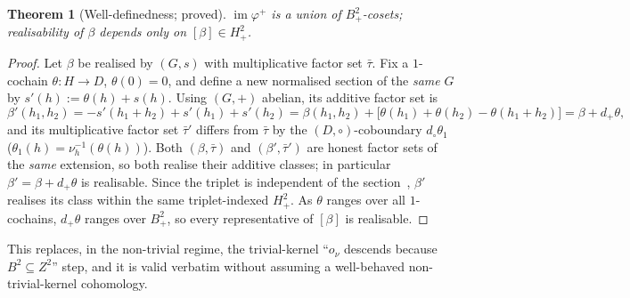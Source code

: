 \documentclass[11pt,reqno]{amsart}
\theoremstyle{plain}
\newtheorem{theorem}{Theorem}[section]
\theoremstyle{definition}
\newcommand{\im}{\operatorname{im}}
\begin{document}
\begin{theorem}[Well-definedness; proved]\label{thm:welldef}
$\im\varphi^{+}$ is a union of $B^2_+$-cosets; realisability of $\beta$ depends only on
$[\beta]\in H^2_+$.
\end{theorem}
\begin{proof}
Let $\beta$ be realised by $(G,s)$ with multiplicative factor set $\bar\tau$. Fix a
$1$-cochain $\theta\colon H\to D$, $\theta(0)=0$, and define a new normalised section of
the \emph{same} $G$ by $s'(h):=\theta(h)+s(h)$. Using $(G,+)$ abelian, its additive factor
set is
\[
\beta'(h_1,h_2)=-s'(h_1{+}h_2)+s'(h_1)+s'(h_2)
=\beta(h_1,h_2)+\big[\theta(h_1)+\theta(h_2)-\theta(h_1{+}h_2)\big]=\beta+d_+\theta,
\]
and its multiplicative factor set $\bar\tau'$ differs from $\bar\tau$ by the
$(D,\circ)$-coboundary $d_\circ\theta_1$ ($\theta_1(h)=\nu_h^{-1}(\theta(h))$). Both
$(\beta,\bar\tau)$ and $(\beta',\bar\tau')$ are honest factor sets of the \emph{same}
extension, so both realise their additive classes; in particular $\beta'=\beta+d_+\theta$
is realisable. Since the triplet is independent of the section~\cite[\S2]{RY}, $\beta'$
realises its class within the same triplet-indexed $H^2_+$. As $\theta$ ranges over all
$1$-cochains, $d_+\theta$ ranges over $B^2_+$, so every representative of $[\beta]$ is
realisable.
\end{proof}

This replaces, in the non-trivial regime, the trivial-kernel ``$o_\nu$ descends because
$B^2\subseteq Z^2$'' step, and it is valid verbatim without assuming a well-behaved
non-trivial-kernel cohomology.
\end{document}
